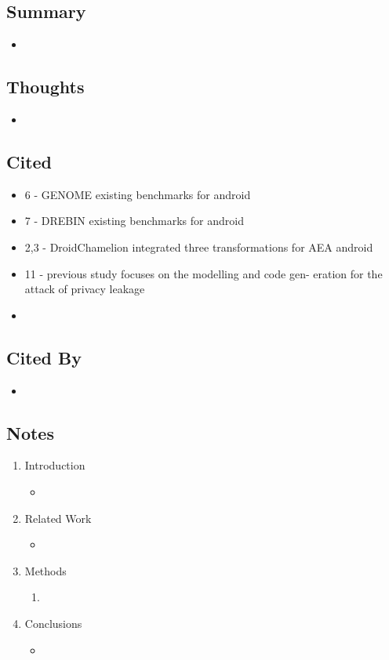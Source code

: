 \documentclass{article}
\begin{document}
\subsection*{Summary}
\begin{itemize}
	\item
\end{itemize}

\subsection*{Thoughts}
\begin{itemize}
	\item
\end{itemize}

\subsection*{Cited}
\begin{itemize}
	\item 6 - GENOME existing benchmarks for android
	\item 7 - DREBIN existing benchmarks for android
	\item 2,3 - DroidChamelion integrated three transformations for AEA android
	\item 11 - previous study focuses on the modelling and code gen- eration for the attack of privacy leakage
	\item 
\end{itemize}

\subsection*{Cited By}
\begin{itemize}
	\item
\end{itemize}

\subsection*{Notes}

\begin{enumerate}
	\item Introduction
	\begin{itemize}
		\item 
	\end{itemize}
	\item Related Work
	\begin{itemize}
		\item 
	\end{itemize}
	\item Methods
	\begin{enumerate}
		\item 
	\end{enumerate}
	\item Conclusions
	\begin{itemize}
		\item 
	\end{itemize}
\end{enumerate}
\end{document}
